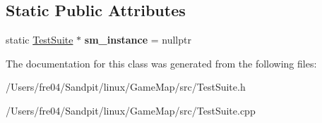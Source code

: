 \subsection*{Static Public Attributes}
\begin{DoxyCompactItemize}
\item 
\hypertarget{class_test_suite_af169e30034bac124caca93ae6cfba22a}{}static \hyperlink{class_test_suite}{Test\+Suite} $\ast$ {\bfseries sm\+\_\+instance} = nullptr\label{class_test_suite_af169e30034bac124caca93ae6cfba22a}

\end{DoxyCompactItemize}


The documentation for this class was generated from the following files\+:\begin{DoxyCompactItemize}
\item 
/\+Users/fre04/\+Sandpit/linux/\+Game\+Map/src/Test\+Suite.\+h\item 
/\+Users/fre04/\+Sandpit/linux/\+Game\+Map/src/Test\+Suite.\+cpp\end{DoxyCompactItemize}
